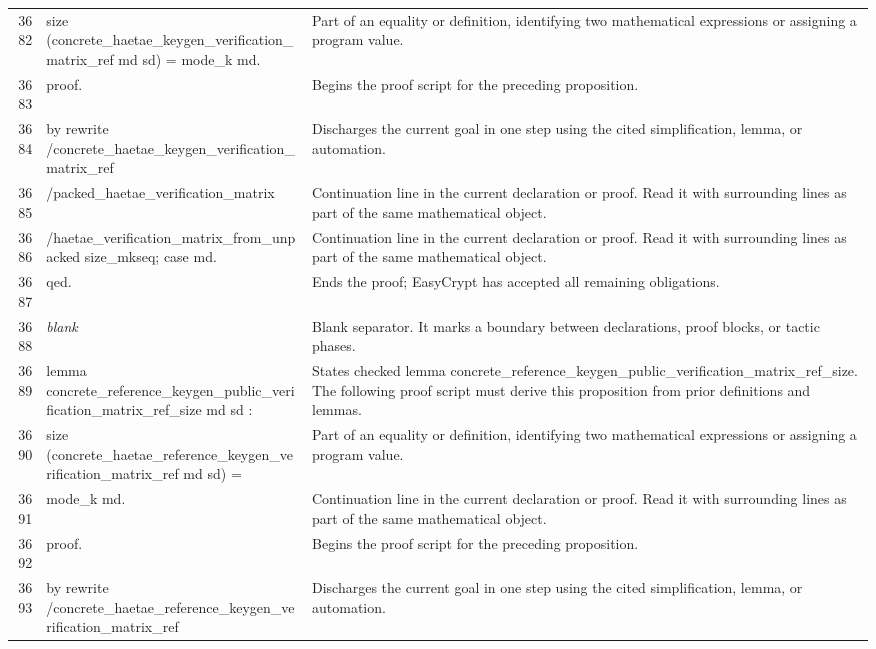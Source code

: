 \documentclass[10pt]{article}
\begin{document}
\begin{longtable}{r L{0.53\textwidth} L{0.37\textwidth}}
3682 & {\ttfamily\scriptsize   size (concrete\_haetae\_keygen\_verification\_matrix\_ref md sd) = mode\_k md.} & Part of an equality or definition, identifying two mathematical expressions or assigning a program value. \\
3683 & {\ttfamily\scriptsize proof.} & Begins the proof script for the preceding proposition. \\
3684 & {\ttfamily\scriptsize by rewrite /concrete\_haetae\_keygen\_verification\_matrix\_ref} & Discharges the current goal in one step using the cited simplification, lemma, or automation. \\
3685 & {\ttfamily\scriptsize            /packed\_haetae\_verification\_matrix} & Continuation line in the current declaration or proof.  Read it with surrounding lines as part of the same mathematical object. \\
3686 & {\ttfamily\scriptsize            /haetae\_verification\_matrix\_from\_unpacked size\_mkseq; case md.} & Continuation line in the current declaration or proof.  Read it with surrounding lines as part of the same mathematical object. \\
3687 & {\ttfamily\scriptsize qed.} & Ends the proof; EasyCrypt has accepted all remaining obligations. \\
3688 & {\ttfamily\scriptsize \emph{blank}} & Blank separator.  It marks a boundary between declarations, proof blocks, or tactic phases. \\
3689 & {\ttfamily\scriptsize lemma concrete\_reference\_keygen\_public\_verification\_matrix\_ref\_size md sd :} & States checked lemma concrete\_reference\_keygen\_public\_verification\_matrix\_ref\_size.  The following proof script must derive this proposition from prior definitions and lemmas. \\
3690 & {\ttfamily\scriptsize   size (concrete\_haetae\_reference\_keygen\_verification\_matrix\_ref md sd) =} & Part of an equality or definition, identifying two mathematical expressions or assigning a program value. \\
3691 & {\ttfamily\scriptsize   mode\_k md.} & Continuation line in the current declaration or proof.  Read it with surrounding lines as part of the same mathematical object. \\
3692 & {\ttfamily\scriptsize proof.} & Begins the proof script for the preceding proposition. \\
3693 & {\ttfamily\scriptsize by rewrite /concrete\_haetae\_reference\_keygen\_verification\_matrix\_ref} & Discharges the current goal in one step using the cited simplification, lemma, or automation. \\

\end{longtable}
\end{document}
